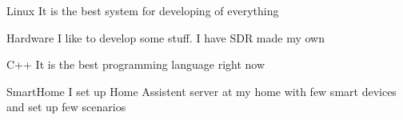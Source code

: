 



\begin{cvskills}

  \cvskill
    {Linux} %
    {It is the best system for developing of everything} %

  \cvskill
    {Hardware} %
    {I like to develop some stuff. I have SDR made my own} %
    
  \cvskill
    {C++} %
    {It is the best programming language right now} %
    
  \cvskill
    {SmartHome} %
    {I set up Home Assistent server at my home with few smart devices and set up few scenarios} %

\end{cvskills}